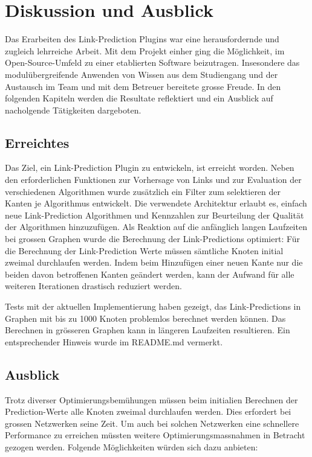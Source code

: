 \chapter{Diskussion und Ausblick}

Das Erarbeiten des Link-Prediction Plugins war eine herausfordernde und zugleich lehrreiche Arbeit.
Mit dem Projekt einher ging die Möglichkeit, im Open-Source-Umfeld zu einer etablierten Software beizutragen.
Insesondere das modulübergreifende Anwenden von Wissen aus dem Studiengang und der Austausch im Team und mit dem Betreuer bereitete grosse Freude.
In den folgenden Kapiteln werden die Resultate reflektiert und ein Ausblick auf nacholgende Tätigkeiten dargeboten.

\section{Erreichtes}

Das Ziel, ein Link-Prediction Plugin zu entwickeln, ist erreicht worden.
Neben den erforderlichen Funktionen zur Vorhersage von Links und zur Evaluation der verschiedenen Algorithmen wurde zusätzlich ein Filter zum selektieren der Kanten je Algorithmus entwickelt.
Die verwendete Architektur erlaubt es, einfach neue Link-Prediction Algorithmen und Kennzahlen zur Beurteilung der Qualität der Algorithmen hinzuzufügen.
Als Reaktion auf die anfänglich langen Laufzeiten bei grossen Graphen wurde die Berechnung der Link-Predictions optimiert:
Für die Berechnung der Link-Prediction Werte müssen sämtliche Knoten initial zweimal durchlaufen werden.
Indem beim Hinzufügen einer neuen Kante nur die beiden davon betroffenen Kanten geändert werden, kann der Aufwand für alle weiteren Iterationen drastisch reduziert werden.

Tests mit der aktuellen Implementierung haben gezeigt, das Link-Predictions in Graphen mit bis zu 1000 Knoten problemlos berechnet werden können.
Das Berechnen in grösseren Graphen kann in längeren Laufzeiten resultieren.
Ein entsprechender Hinweis wurde im README.md vermerkt.


\section{Ausblick}

Trotz diverser Optimierungsbemühungen müssen beim initialien Berechnen der Prediction-Werte alle Knoten zweimal durchlaufen werden.
Dies erfordert bei grossen Netzwerken seine Zeit.
Um auch bei solchen Netzwerken eine schnellere Performance zu erreichen müssten weitere Optimierungsmassnahmen in Betracht gezogen werden.
Folgende Möglichkeiten würden sich dazu anbieten:

